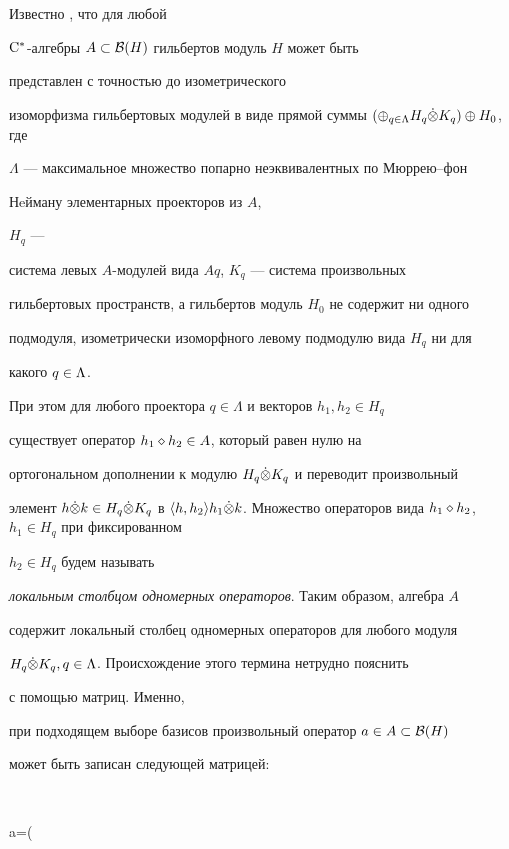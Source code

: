 Известно \cite {Chel4}, что для любой


$\mathrm C^*$-алгебры $A \subset {\cal B} (H)$ гильбертов модуль $H$ может быть


представлен с точностью до изометрического


изоморфизма гильбертовых модулей в виде прямой суммы $(\oplus_{q


\in \Lambda} H_q \tenp K_q) \oplus H_0$, где


$\Lambda$ --- максимальное множество попарно неэквивалентных по Мюррею--фон


Нeйману элементарных проекторов из $A$,


$H_q$ ---


система левых $A$-модулей вида $Aq$, $K_q$ --- система произвольных


гильбертовых пространств, а гильбертов модуль $H_0$ не содержит ни одного


подмодуля, изометрически изоморфного левому подмодулю вида $H_q$ ни для


какого $q \in \Lambda$.





При этом для любого проектора $q \in \Lambda$ и векторов $h_1,h_2 \in H_q$


существует оператор $h_1 \diamond h_2 \in A$, который равен нулю на


ортогональном дополнении к модулю $H_q \Dot \otimes K_q$ и переводит произвольный


элемент $h \tenp k \in H_q \tenp K_q$ в $\lan h,h_2 \ran h_1 \tenp


k$. Множество операторов вида $h_1 \dia h_2$, $h_1 \in H_q$ при фиксированном


$h_2 \in H_q$ будем называть


{\it локальным столбцом одномерных операторов}. Таким образом, алгебра $A$


содержит локальный столбец одномерных операторов для любого модуля


$H_q \Dot \otimes K_q,q \in \Lambda$. Происхождение этого термина нетрудно пояснить


с помощью матриц. Именно,


при подходящем выборе базисов произвольный оператор $a \in A \subset {\cal B} (H)$


может быть записан следующей матрицей:


$$


a=\left (


